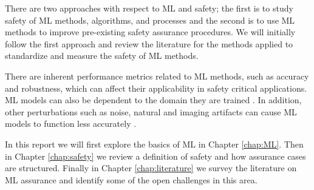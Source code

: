 There are two approaches with respect to ML and safety; the first is to study safety of ML methods, algorithms, and processes and the second is to use ML methods to improve pre-existing safety assurance procedures.
We will initially follow the first approach and review the literature for the methods applied to standardize and measure the safety of ML methods.

There are inherent performance metrics related to ML methods, such as accuracy and robustness, which can affect their applicability in safety critical applications. ML models can also be dependent to the domain they are trained \cite{Ganin2015}. In addition, other perturbations such as noise, natural and imaging artifacts can cause ML models to function less accurately \cite{Hendrycks2019}.

In this report we will first explore the basics of ML in Chapter \ref{chap:ML}. Then in Chapter \ref{chap:safety} we review a definition of safety and how assurance cases are structured. Finally in Chapter \ref{chap:literature} we survey the literature on ML assurance and identify some of the open challenges in this area.